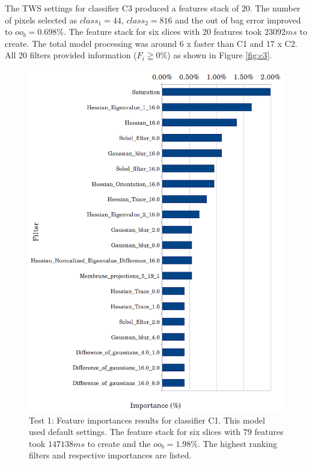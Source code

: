 The \ac{TWS} settings for classifier C3 produced a features stack of 20. The number of pixels selected as $class_1 = 44 $, $ class_2 = 816 $ and the out of bag error improved to $ oo_b = 0.698\%$. The feature stack for six slices with $20$ features took $ 23092ms $ to create. The total model processing was around 6 x faster than C1 and 17 x C2. All 20 filters provided information ($F_i\geqq0\%$) as shown in Figure \ref{fig:c3}. 

\begin{figure}[!htbp]\myfloatalign
\includegraphics[width=1\linewidth]{gfx6/features/c1-importances} 
\caption[Feature importances test 1.]{Test 1: Feature importances results for classifier C1. This model used default settings. The feature stack for six slices with $ 79 $ features took $ 147138ms $ to create and the $ oo_b=1.98\%$. The highest ranking filters and respective importances are listed.}\label{fig:c1}
\end{figure}


